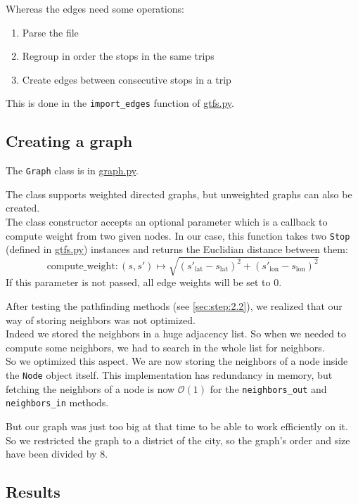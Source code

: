 \documentclass[12pt,english]{article}
\begin{document}
	Whereas the edges need some operations:
	\begin{enumerate}
		\item Parse the file
		\item Regroup in order the stops in the same trips
		\item Create edges between consecutive stops in a trip
	\end{enumerate}
	This is done in the \texttt{import\_edges} function of \hyperref[sec:code:gtfs]{\ttfamily gtfs.py}.

	\subsection{Creating a graph}\label{sec:step:1.2}

	The \texttt{Graph} class is in \hyperref[sec:code:graph]{\ttfamily graph.py}.

	The class supports weighted directed graphs, but unweighted graphs can also be created.\\
	The class constructor accepts an optional parameter which is a callback to compute weight from two given nodes.
	In our case, this function takes two \texttt{Stop} (defined in \hyperref[sec:code:gtfs]{\ttfamily gtfs.py}) instances and returns the Euclidian distance between them: \[
		\text{compute\_weight}: (s,s') \mapsto \sqrt{\left(s'_\text{lat} - s_\text{lat}\right)^2 + \left(s'_\text{lon} - s_\text{lon}\right)^2}
	\]
	If this parameter is not passed, all edge weights will be set to \(0\).

	After testing the pathfinding methods (see \autoref{sec:step:2.2}), we realized that our way of storing neighbors was not optimized.\\
	Indeed we stored the neighbors in a huge adjacency list.
	So when we needed to compute some neighbors, we had to search in the whole list for neighbors.\\
	So we optimized this aspect.
	We are now storing the neighbors of a node inside the \texttt{Node} object itself.
	This implementation has redundancy in memory, but fetching the neighbors of a node is now \(\mathcal{O}(1)\) for the \texttt{neighbors\_out} and \texttt{neighbors\_in} methods.

	But our graph was just too big at that time to be able to work efficiently on it.\\
	So we restricted the graph to a district of the city, so the graph's order and size have been divided by 8.

	\subsection{Results}\label{sec:results:1}
\end{document}
